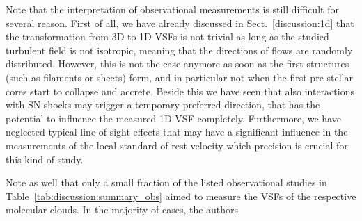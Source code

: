 Note that the interpretation of observational measurements is still difficult for several reason.
First of all, we have already discussed in Sect.~\ref{discussion:1d} that the transformation from 3D to 1D VSFs is not trivial as long as the studied turbulent field is not isotropic, meaning that the directions of flows are randomly distributed. 
However, this is not the case anymore as soon as the first structures (such as filaments or sheets) form, and in particular not when the first pre-stellar cores start to collapse and accrete.
Beside this we have seen that also interactions with SN shocks may trigger a temporary preferred direction, that has the potential to influence the measured 1D VSF completely.
Furthermore, we have neglected typical line-of-sight effects that may have a significant influence in the measurements of the local standard of rest velocity which precision is crucial for this kind of study.

Note as well that only a small fraction of the listed observational studies in Table~\ref{tab:discussion:summary_obs} aimed to measure the VSFs of the respective molecular clouds. 
In the majority of cases, the authors 











